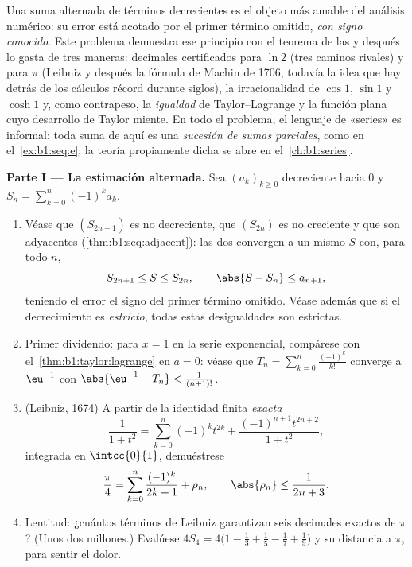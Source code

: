 \begin{problem}
\label{pb:b1:taylor:1}
Una suma alternada de términos decrecientes es el objeto más amable
del análisis numérico: su error está acotado por el primer término
omitido, \emph{con signo conocido}. Este problema demuestra ese
principio con el teorema de las  y después lo
gasta de tres maneras: decimales certificados para $\ln 2$ (tres
caminos rivales) y para $\pi$ (Leibniz y después la fórmula de Machin
de 1706, todavía la idea que hay detrás de los cálculos récord
durante siglos), la irracionalidad de $\cos 1$, $\sin 1$ y $\cosh 1$
y, como contrapeso, la \emph{igualdad} de Taylor--Lagrange y la
función plana cuyo desarrollo de Taylor miente. En todo el problema, el lenguaje de «series» es
informal: toda suma de aquí es una \emph{sucesión de sumas
parciales}, como en el~\cref{ex:b1:seq:e}; la teoría propiamente
dicha se abre en el~\cref{ch:b1:series}.

\medskip
\noindent\textbf{Parte I --- La estimación alternada.} Sea
$(a_k)_{k \geq 0}$ decreciente hacia $0$ y
$S_n = \sum_{k=0}^{n} (-1)^k a_k$.
\begin{enumerate}
  \item Véase que $(S_{2n+1})$ es no decreciente, que $(S_{2n})$ es
        no creciente y que son adyacentes
        (\cref{thm:b1:seq:adjacent}): las dos convergen a un mismo
        $S$ con, para todo $n$,
        \[
        S_{2n+1} \leq S \leq S_{2n},
        \qquad
        \abs{S - S_n} \leq a_{n+1} ,
        \]
        teniendo el error el signo del primer término omitido.
        Véase además que si el decrecimiento es \emph{estricto},
        todas estas desigualdades son estrictas.
  \item Primer dividendo: para $x = 1$ en la serie exponencial,
        compárese con el~\cref{thm:b1:taylor:lagrange} en $a = 0$:
        véase que $T_n = \sum_{k=0}^{n} \frac{(-1)^k}{k!}$ converge
        a $\eu^{-1}$ con
        $\abs{\eu^{-1} - T_n} < \frac{1}{(n+1)!}$.
  \item (Leibniz, 1674) A partir de la identidad finita
        \emph{exacta}
        \[
        \frac{1}{1 + t^2} = \sum_{k=0}^{n} (-1)^k t^{2k}
        + \frac{(-1)^{n+1} t^{2n+2}}{1 + t^2} ,
        \]
        integrada en $\intcc{0}{1}$, demuéstrese
        \[
        \frac\pi4 = \sum_{k=0}^{n} \frac{(-1)^k}{2k+1} + \rho_n,
        \qquad \abs{\rho_n} \leq \frac{1}{2n+3} .
        \]
  \item Lentitud: ¿cuántos términos de Leibniz garantizan seis
        decimales exactos de $\pi$? (Unos dos millones.) Evalúese
        $4 S_4 = 4\bigl(1 - \frac13 + \frac15 - \frac17 +
        \frac19\bigr)$ y su distancia a $\pi$, para sentir el
        dolor.
\end{enumerate}


\end{problem}
